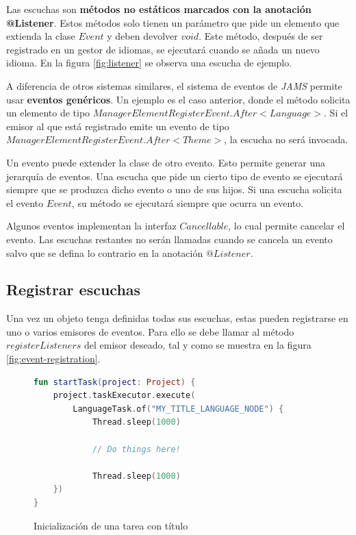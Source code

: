 Las escuchas son \textbf{métodos no estáticos marcados con la anotación @Listener}.
Estos métodos solo tienen un parámetro que pide un elemento que extienda la clase
$Event$ y deben devolver $void$.
Este método, después de ser registrado en un gestor de idiomas,
se ejecutará cuando se añada un nuevo idioma.
En la figura \ref{fig:listener} se observa una escucha de ejemplo.

A diferencia de otros sistemas similares,
el sistema de eventos de \textit{JAMS} permite usar \textbf{eventos genéricos}.
Un ejemplo es el caso anterior, donde el método solicita un elemento de tipo
$ManagerElementRegisterEvent.After<Language>$.
Si el emisor al que está registrado emite un evento de tipo
$ManagerElementRegisterEvent.After<Theme>$, la escucha no será invocada.

Un evento puede extender la clase de otro evento.
Esto permite generar una jerarquía de eventos.
Una escucha que pide un cierto tipo de evento se ejecutará siempre
que se produzca dicho evento o uno de sus hijos.
Si una escucha solicita el evento $Event$,
su método se ejecutará siempre que ocurra un evento.

Algunos eventos implementan la interfaz $Cancellable$, lo cual permite cancelar el evento.
Las escuchas restantes no serán llamadas cuando se cancela un evento salvo que se defina lo contrario
en la anotación $@Listener$.

\subsection{Registrar escuchas}\label{subsec:registrar-escuchas}

Una vez un objeto tenga definidas todas sus escuchas, estas
pueden registrarse en uno o varios emisores de eventos.
Para ello se debe llamar al método $registerListeners$ del
emisor deseado, tal y como se muestra en la figura \ref{fig:event-registration}.

\begin{figure}[h]
    \centering
    \begin{lstlisting}[frame=single,label={lst:tasks-execution},language=Kotlin]
fun startTask(project: Project) {
    project.taskExecutor.execute(
        LanguageTask.of("MY_TITLE_LANGUAGE_NODE") {
            Thread.sleep(1000)

            // Do things here!

            Thread.sleep(1000)
    })
}
    \end{lstlisting}
    \caption{Inicialización de una tarea con título}
    \label{fig:tasks-execution}
\end{figure}

